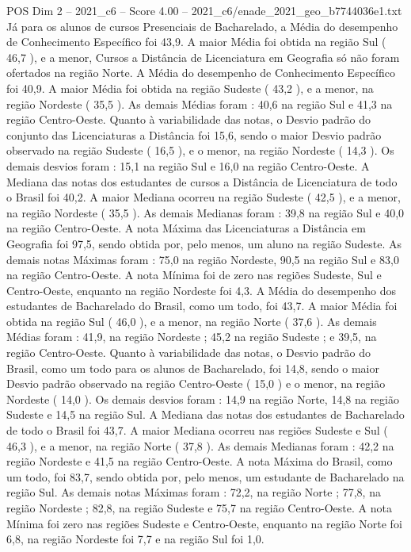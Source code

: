 \begin{textsample}{POS Dim 2 – 2021\_c6 – Score 4.00 – 2021\_c6/enade\_2021\_geo\_b7744036e1.txt}
Já para os alunos de cursos Presenciais de Bacharelado, a Média do desempenho de Conhecimento Específico foi 43,9.
A maior Média foi obtida na região Sul ( 46,7 ), e a menor, Cursos a Distância de Licenciatura em Geografia só não foram ofertados na região Norte.
A Média do desempenho de Conhecimento Específico foi 40,9.
A maior Média foi obtida na região Sudeste ( 43,2 ), e a menor, na região Nordeste ( 35,5 ).
As demais Médias foram : 40,6 na região Sul e 41,3 na região Centro-Oeste.
Quanto à variabilidade das notas, o Desvio padrão do conjunto das Licenciaturas a Distância foi 15,6, sendo o maior Desvio padrão observado na região Sudeste ( 16,5 ), e o menor, na região Nordeste ( 14,3 ).
Os demais desvios foram : 15,1 na região Sul e 16,0 na região Centro-Oeste.
A Mediana das notas dos estudantes de cursos a Distância de Licenciatura de todo o Brasil foi 40,2.
A maior Mediana ocorreu na região Sudeste ( 42,5 ), e a menor, na região Nordeste ( 35,5 ).
As demais Medianas foram : 39,8 na região Sul e 40,0 na região Centro-Oeste.
A nota Máxima das Licenciaturas a Distância em Geografia foi 97,5, sendo obtida por, pelo menos, um aluno na região Sudeste.
As demais notas Máximas foram : 75,0 na região Nordeste, 90,5 na região Sul e 83,0 na região Centro-Oeste.
A nota Mínima foi de zero nas regiões Sudeste, Sul e Centro-Oeste, enquanto na região Nordeste foi 4,3.
A Média do desempenho dos estudantes de Bacharelado do Brasil, como um todo, foi 43,7.
A maior Média foi obtida na região Sul ( 46,0 ), e a menor, na região Norte ( 37,6 ).
As demais Médias foram : 41,9, na região Nordeste ; 45,2 na região Sudeste ; e 39,5, na região Centro-Oeste.
Quanto à variabilidade das notas, o Desvio padrão do Brasil, como um todo para os alunos de Bacharelado, foi 14,8, sendo o maior Desvio padrão observado na região Centro-Oeste ( 15,0 ) e o menor, na região Nordeste ( 14,0 ).
Os demais desvios foram : 14,9 na região Norte, 14,8 na região Sudeste e 14,5 na região Sul.
A Mediana das notas dos estudantes de Bacharelado de todo o Brasil foi 43,7.
A maior Mediana ocorreu nas regiões Sudeste e Sul ( 46,3 ), e a menor, na região Norte ( 37,8 ).
As demais Medianas foram : 42,2 na região Nordeste e 41,5 na região Centro-Oeste.
A nota Máxima do Brasil, como um todo, foi 83,7, sendo obtida por, pelo menos, um estudante de Bacharelado na região Sul.
As demais notas Máximas foram : 72,2, na região Norte ; 77,8, na região Nordeste ; 82,8, na região Sudeste e 75,7 na região Centro-Oeste.
A nota Mínima foi zero nas regiões Sudeste e Centro-Oeste, enquanto na região Norte foi 6,8, na região Nordeste foi 7,7 e na região Sul foi 1,0.

\end{textsample}
